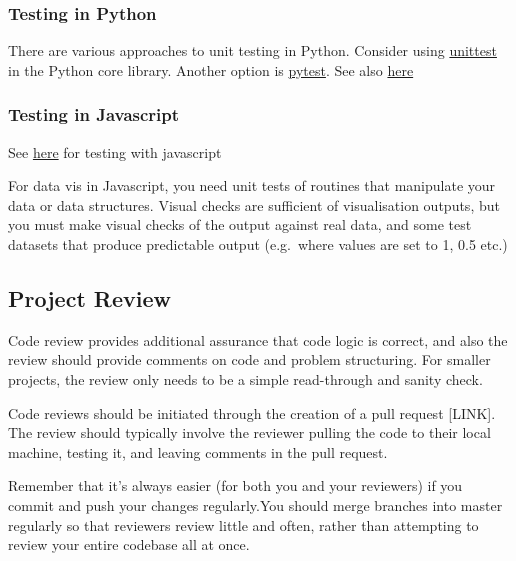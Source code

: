 \documentclass[]{book}
\begin{document}
\hypertarget{testing-in-python}{%
\subsubsection*{Testing in Python}\label{testing-in-python}}

There are various approaches to unit testing in Python. Consider using \href{https://docs.python.org/3/library/unittest.html}{unittest} in the Python core library. Another option is \href{https://docs.pytest.org/en/latest/}{pytest}. See also \href{http://python-guide-pt-br.readthedocs.io/en/latest/writing/tests/}{here}

\hypertarget{testing-in-javascript}{%
\subsubsection*{Testing in Javascript}\label{testing-in-javascript}}

See \href{http://busypeoples.github.io/post/testing-d3-with-jasmine/}{here} for testing with javascript

For data vis in Javascript, you need unit tests of routines that manipulate your data or data structures. Visual checks are sufficient of visualisation outputs, but you must make visual checks of the output against real data, and some test datasets that produce predictable output (e.g.~where values are set to 1, 0.5 etc.)

\hypertarget{review}{%
\subsection{Project Review}\label{review}}

Code review provides additional assurance that code logic is correct, and also the review should provide comments on code and problem structuring. For smaller projects, the review only needs to be a simple read-through and sanity check.

Code reviews should be initiated through the creation of a pull request {[}LINK{]}. The review should typically involve the reviewer pulling the code to their local machine, testing it, and leaving comments in the pull request.

Remember that it's always easier (for both you and your reviewers) if you commit and push your changes regularly.You should merge branches into master regularly so that reviewers review little and often, rather than attempting to review your entire codebase all at once.
\end{document}
